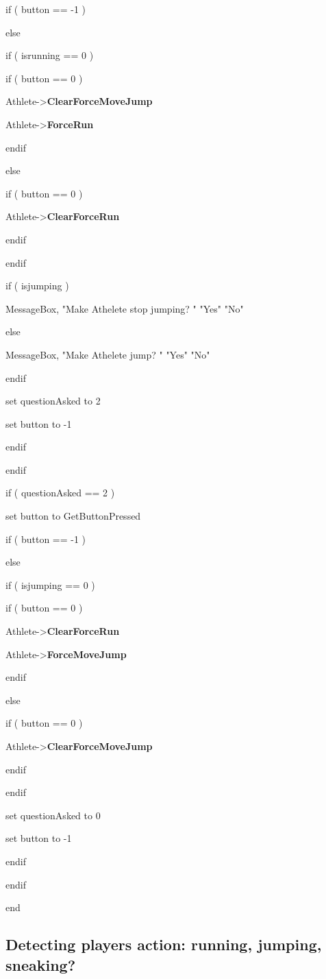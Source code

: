 \documentclass[
]{article}
\begin{document}
if ( button == -1 )

else

if ( isrunning == 0 )

if ( button == 0 )

Athlete-\textgreater{}\textbf{ClearForceMoveJump}

Athlete-\textgreater{}\textbf{ForceRun}

endif

else

if ( button == 0 )

Athlete-\textgreater{}\textbf{ClearForceRun}

endif

endif

if ( isjumping )

MessageBox, "Make Athelete stop jumping? " "Yes" "No"

else

MessageBox, "Make Athelete jump? " "Yes" "No"

endif

set questionAsked to 2

set button to -1

endif

endif

if ( questionAsked == 2 )

set button to GetButtonPressed

if ( button == -1 )

else

if ( isjumping == 0 )

if ( button == 0 )

Athlete-\textgreater{}\textbf{ClearForceRun}

Athlete-\textgreater{}\textbf{ForceMoveJump}

endif

else

if ( button == 0 )

Athlete-\textgreater{}\textbf{ClearForceMoveJump}

endif

endif

set questionAsked to 0

set button to -1

endif

endif

end

\hypertarget{detecting-players-action-running-jumping-sneaking}{%
\subsection{Detecting players action: running, jumping,
sneaking?}\label{detecting-players-action-running-jumping-sneaking}}
\end{document}
